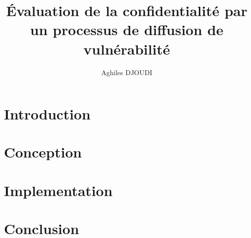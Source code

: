 \documentclass[8pt]{beamer}
\begin{document}
\title{Évaluation de la confidentialité par un processus de diffusion de vulnérabilité}
\author{Aghiles DJOUDI}

\firstpage

\section{Introduction}
%	
%	
%	
%	
%	

\tableofcontent

\section{Conception}
\begin{frame}[noframenumbering]
\end{frame}

\section{Implementation}
	
	
%	
%	
%	
%	
%	
%	
%	
%	

\section{Conclusion}
	


\frameBibliography
\end{document}
